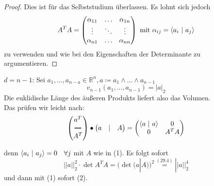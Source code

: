 \begin{proof}
    Dies ist für das Selbststudium überlassen. Es lohnt sich jedoch
	\begin{equation*}
		A^T A = 
    	\begin{pmatrix}
        	\alpha_{11} & \ldots & \alpha_{1n} \\
        	\vdots      & \ddots & \vdots \\
        	\alpha_{n1} & \ldots & \alpha_{nn}
    	\end{pmatrix}\
   		 \text{mit\ } \alpha_{ij}=\left\langle a_i \ \middle| \ a_j\right\rangle
	\end{equation*}	    
    zu verwenden und wie bei den Eigenschaften der Determinante zu argumentieren.
\end{proof}

\begin{beispiel}
    $d = n-1 $: Sei $a_1, \ldots, a_{n-a} \in \mathbb{R}^n, 
    a \coloneqq a_1 \wedge \ldots \wedge a_{n-1} $
    \begin{equation}
        v_{n-1} (a_1, \ldots, a_{n-1}) = |a|_2
    \end{equation}
    Die euklidische Länge des äußeren Produkts liefert also das Volumen.\\
    Das prüfen wir leicht nach: 
    \begin{equation*}
    	\begin{pmatrix}
        a^T \\
        \rule[.5ex]{1em}{1pt}\\
        A^T
    \end{pmatrix}
    \bullet
    \begin{pmatrix}
        a & | & A 
    \end{pmatrix}
    =
    \begin{pmatrix}
        \scap{a}{a} & 0 \\
        0 & A^T A
    \end{pmatrix}
    \end{equation*}
    
    denn $\left\langle a_i \ \middle| \ a_j\right\rangle = 0 \ \ \ \forall j $ mit $A$ wie in (1). Es folgt sofort
	\begin{equation*}
	||a||_2^2 \cdot \det A^T A = (\det (a|A))^2 \stackrel{(29.4)}{=}
    ||a||_2^4
	\end{equation*}	    
    und dann mit (1) sofort (2).
\end{beispiel}

